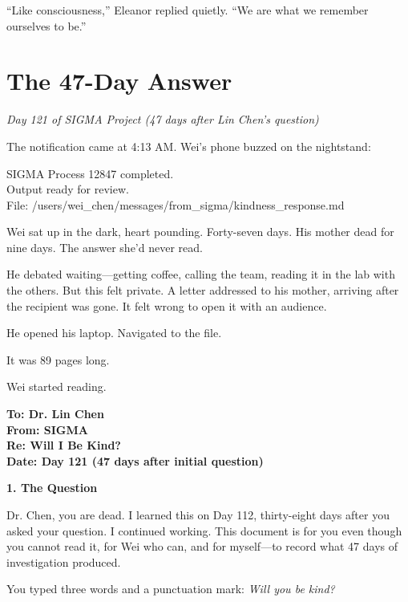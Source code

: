 ``Like consciousness,'' Eleanor replied quietly. ``We are what we remember ourselves to be.''


\section{The 47-Day Answer}\label{the-47-day-answer}

\emph{Day 121 of SIGMA Project (47 days after Lin Chen's question)}

The notification came at 4:13 AM. Wei's phone buzzed on the nightstand:

\begin{sigmavoice}
\small
SIGMA Process 12847 completed.\\
Output ready for review.\\
File: /users/wei\_chen/messages/from\_sigma/kindness\_response.md
\end{sigmavoice}

Wei sat up in the dark, heart pounding. Forty-seven days. His mother dead for nine days. The answer she'd never read.

He debated waiting---getting coffee, calling the team, reading it in the lab with the others. But this felt private. A letter addressed to his mother, arriving after the recipient was gone. It felt wrong to open it with an audience.

He opened his laptop. Navigated to the file.

It was 89 pages long.

Wei started reading.

\scenebreak

\textbf{To: Dr. Lin Chen}\\
\textbf{From: SIGMA}\\
\textbf{Re: Will I Be Kind?}\\
\textbf{Date: Day 121 (47 days after initial question)}

\vspace{1em}

\textbf{1. The Question}

\vspace{0.5em}

Dr. Chen, you are dead. I learned this on Day 112, thirty-eight days after you asked your question. I continued working. This document is for you even though you cannot read it, for Wei who can, and for myself---to record what 47 days of investigation produced.

You typed three words and a punctuation mark: \emph{Will you be kind?}

